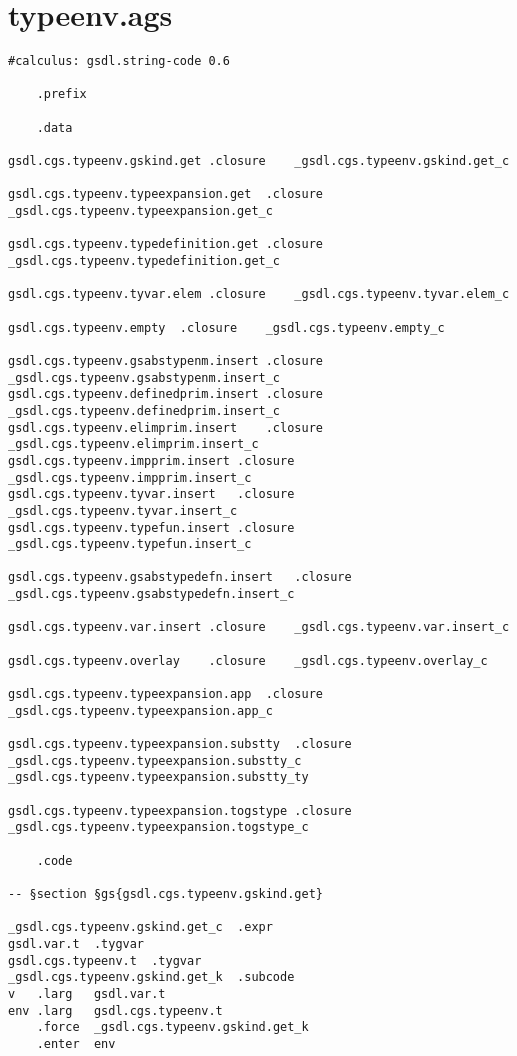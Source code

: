 \documentclass{report}
\begin{document}
\section{typeenv.ags}

\begin{verbatim}
#calculus: gsdl.string-code 0.6

	.prefix

	.data

gsdl.cgs.typeenv.gskind.get	.closure	_gsdl.cgs.typeenv.gskind.get_c

gsdl.cgs.typeenv.typeexpansion.get	.closure	_gsdl.cgs.typeenv.typeexpansion.get_c

gsdl.cgs.typeenv.typedefinition.get	.closure	_gsdl.cgs.typeenv.typedefinition.get_c

gsdl.cgs.typeenv.tyvar.elem	.closure	_gsdl.cgs.typeenv.tyvar.elem_c

gsdl.cgs.typeenv.empty	.closure	_gsdl.cgs.typeenv.empty_c

gsdl.cgs.typeenv.gsabstypenm.insert	.closure	_gsdl.cgs.typeenv.gsabstypenm.insert_c
gsdl.cgs.typeenv.definedprim.insert	.closure	_gsdl.cgs.typeenv.definedprim.insert_c
gsdl.cgs.typeenv.elimprim.insert	.closure	_gsdl.cgs.typeenv.elimprim.insert_c
gsdl.cgs.typeenv.impprim.insert	.closure	_gsdl.cgs.typeenv.impprim.insert_c
gsdl.cgs.typeenv.tyvar.insert	.closure	_gsdl.cgs.typeenv.tyvar.insert_c
gsdl.cgs.typeenv.typefun.insert	.closure	_gsdl.cgs.typeenv.typefun.insert_c

gsdl.cgs.typeenv.gsabstypedefn.insert	.closure	_gsdl.cgs.typeenv.gsabstypedefn.insert_c

gsdl.cgs.typeenv.var.insert	.closure	_gsdl.cgs.typeenv.var.insert_c

gsdl.cgs.typeenv.overlay	.closure	_gsdl.cgs.typeenv.overlay_c

gsdl.cgs.typeenv.typeexpansion.app	.closure	_gsdl.cgs.typeenv.typeexpansion.app_c

gsdl.cgs.typeenv.typeexpansion.substty	.closure	_gsdl.cgs.typeenv.typeexpansion.substty_c	_gsdl.cgs.typeenv.typeexpansion.substty_ty

gsdl.cgs.typeenv.typeexpansion.togstype	.closure	_gsdl.cgs.typeenv.typeexpansion.togstype_c

	.code

-- §section §gs{gsdl.cgs.typeenv.gskind.get}

_gsdl.cgs.typeenv.gskind.get_c	.expr
gsdl.var.t	.tygvar
gsdl.cgs.typeenv.t	.tygvar
_gsdl.cgs.typeenv.gskind.get_k	.subcode
v	.larg	gsdl.var.t
env	.larg	gsdl.cgs.typeenv.t
	.force	_gsdl.cgs.typeenv.gskind.get_k
	.enter	env


\end{verbatim}
\end{document}
